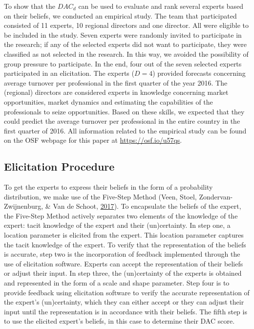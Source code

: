 \documentclass[openright,titlepage,12pt,a4paper]{book}
\begin{document}
To show that the \(DAC_d\) can be used to evaluate and rank several experts based on their beliefs, we conducted an empirical study. The team that participated consisted of 11 experts, 10 regional directors and one director. All were eligible to be included in the study. Seven experts were randomly invited to participate in the research; if any of the selected experts did not want to participate, they were classified as not selected in the research. In this way, we avoided the possibility of group pressure to participate. In the end, four out of the seven selected experts participated in an elicitation. The experts (\(D = 4\)) provided forecasts concerning average turnover per professional in the first quarter of the year 2016. The (regional) directors are considered experts in knowledge concerning market opportunities, market dynamics and estimating the capabilities of the professionals to seize opportunities. Based on these skills, we expected that they could predict the average turnover per professional in the entire country in the first quarter of 2016. All information related to the empirical study can be found on the OSF webpage for this paper at \url{https://osf.io/u57qs}.

\hypertarget{elicitation-procedure}{%
\subsection{Elicitation Procedure}\label{elicitation-procedure}}

To get the experts to express their beliefs in the form of a probability distribution, we make use of the Five-Step Method (Veen, Stoel, Zondervan-Zwijnenburg, \& Van de Schoot, \protect\hyperlink{ref-veen_proposal_2017}{2017}). To encapsulate the beliefs of the expert, the Five-Step Method actively separates two elements of the knowledge of the expert: tacit knowledge of the expert and their (un)certainty. In step one, a location parameter is elicited from the expert. This location parameter captures the tacit knowledge of the expert. To verify that the representation of the beliefs is accurate, step two is the incorporation of feedback implemented through the use of elicitation software. Experts can accept the representation of their beliefs or adjust their input. In step three, the (un)certainty of the experts is obtained and represented in the form of a scale and shape parameter. Step four is to provide feedback using elicitation software to verify the accurate representation of the expert's (un)certainty, which they can either accept or they can adjust their input until the representation is in accordance with their beliefs. The fifth step is to use the elicited expert's beliefs, in this case to determine their DAC score.
\end{document}
